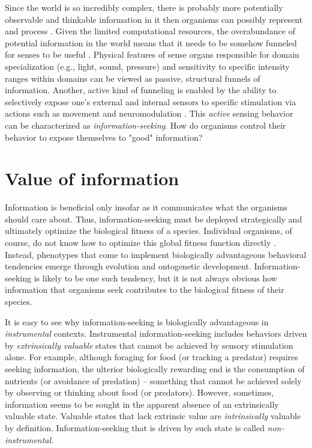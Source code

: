 Since the world is so incredibly complex, there is probably more potentially observable and thinkable information in it then organisms can possibly represent and process \parencite{kolmogorov1965three}. Given the limited computational resources, the overabundance of potential information in the world means that it needs to be somehow funneled for senses to be useful \parencite{gottlieb_towards_2018}. Physical features of sense organs responsible for domain specialization (e.g., light, sound, pressure) and sensitivity to specific intensity ranges within domains \parencite[e.g.,][]{schwab_evolution_2018} can be viewed as passive, structural funnels of information. Another, active kind of funneling is enabled by the ability to selectively expose one's external and internal sensors to specific stimulation via actions such as movement \parencite[e.g. ][]{gottlieb_information-seeking_2013} and neuromodulation \parencite[e.g.,][]{yu_uncertainty_2005}. This \emph{active} sensing behavior can be characterized as \emph{information-seeking}. How do organisms control their behavior to expose themselves to "good" information?

\section{Value of information}\label{CH2_S_value_of_information}

Information is beneficial only insofar as it communicates what the organisms should care about. Thus, information-seeking must be deployed strategically and ultimately optimize the biological fitness of a species. Individual organisms, of course, do not know how to optimize this global fitness function directly \parencite{ten_berge_procedural_1999,singh_intrinsically_2010,gottlieb_information-seeking_2013}. Instead, phenotypes that come to implement biologically advantageous behavioral tendencies emerge through evolution and ontogenetic development. Information-seeking is likely to be one such tendency, but it is not always obvious how information that organisms seek contributes to the biological fitness of their species.

It is easy to see why information-seeking is biologically advantageous in \emph{instrumental} contexts. Instrumental information-seeking includes behaviors driven by \emph{extrinsically valuable} states that cannot be achieved by sensory stimulation alone. For example, although foraging for food (or tracking a predator) requires seeking information, the ulterior biologically rewarding end is the consumption of nutrients (or avoidance of predation) -- something that cannot be achieved solely by observing or thinking about food (or predators). However, sometimes, information seems to be sought in the apparent absence of an extrinsically valuable state. Valuable states that lack extrinsic value are \emph{intrinsically} valuable by definition. Information-seeking that is driven by such state is called \emph{non-instrumental}.

